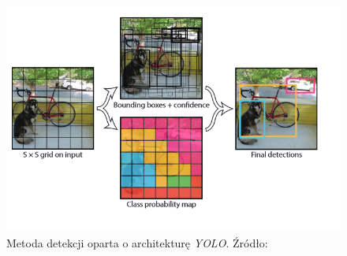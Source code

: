 \begin{figure}
    \centering
    \includegraphics[width=0.9\linewidth]{images/yolo.png}
    \caption{Metoda detekcji oparta o architekturę \emph{YOLO}. Źródło: \cite{yolov1}}
    \label{fig:yolo_img}
\end{figure}

